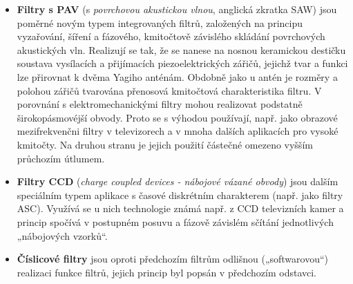\begin{itemize}
                elektrický. Chovají se tedy vesměs jako pásmové propusti. Podle typu mechanického
                rezonátoru je lze dělit na různé skupiny. Dříve byly používány např. magnetostrikční
                filtry a dnes jsou používané nejčastěji \emph{piezokeramické filtry} (např.
                mezifrekvenčni filtry \SI{455}{\kilo\hertz} a \SI{10.7}{\mega\hertz}).
                Zvláštním typem je \emph{krystalový filtr}, který odpovídá v podstatě složenému
                rezonančnímu obvodu s vysokým činitelem jakosti (řádové \num{10000}) a vysokou
                stabilitou rezonančního kmitočtu. Nejčastěji se využívá ve stabilních oscilátorech.
                Vzhledem k vysokému a nenastavitelnému činiteli jakosti a nenastavitelnému
                rezonančnímu kmitočtu se krystaly jako filtry používají velmi omezené. Zapojením
                většího počtu krystalů s velmi přesným výběrem lze realizovat úzký pásmový filtr pro
                speciální aplikace jako např. úzkopásmové mezifrekvenčni filtry s vysokým
                rezonančním kmitočtem.
          \item \textbf{Filtry s PAV} (s \emph{povrchovou akustickou vlnou}, anglická zkratka SAW)
                jsou poměrné novým typem integrovaných filtrů, založených na principu vyzařování,
                šíření a fázového, kmitočtově závislého skládání povrchových akustických vln.
                Realizují se tak, že se nanese na nosnou keramickou destičku soustava vysílacích a
                přijímacích piezoelektrických zářičů, jejichž tvar a funkci lze přirovnat k dvěma
                Yagiho anténám. Obdobně jako u antén je rozměry a polohou zářičů tvarována přenosová
                kmitočtová charakteristika filtru. V porovnání s elektromechanickými filtry mohou
                realizovat podstatně širokopásmovéjší obvody. Proto se s výhodou používají, např.
                jako obrazové mezifrekvenčni filtry v televizorech a v mnoha dalších aplikacích pro
                vysoké kmitočty. Na druhou stranu je jejich použití částečné omezeno vyšším
                průchozím útlumem.
          \item \textbf{Filtry CCD} (\emph{charge coupled devices - nábojové vázané obvody}) jsou
                dalším speciálním typem aplikace s časové diskrétním charakterem (např. jako filtry
                ASC). Využívá se u nich technologie známá např. z CCD televizních kamer a princip
                spočívá v postupném posuvu a fázově závislém sčítání jednotlivých „nábojových
                vzorků“.
          \item \textbf{Číslicové filtry} jsou oproti předchozím filtrům odlišnou („softwarovou“)
                realizaci funkce filtrů, jejich princip byl popsán v předchozím odstavci.
        \end{itemize}
